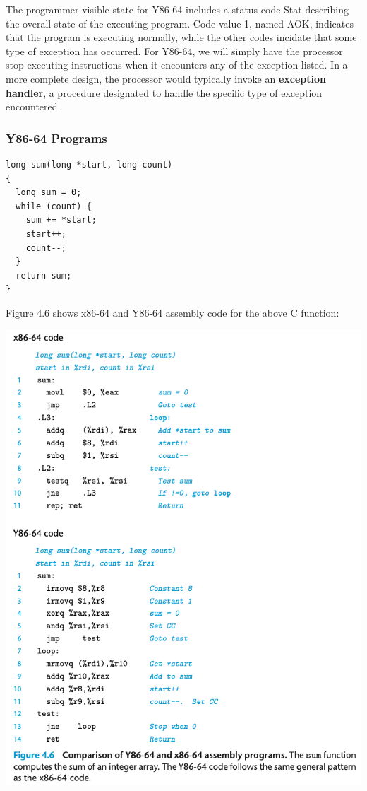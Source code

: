 \documentclass[11pt]{article}
\begin{document}
The programmer-visible state for Y86-64 includes a status code Stat describing the overall state of the executing program. Code value 1, named AOK, indicates that the program is executing normally, while the other codes incidate that some type of exception has occurred. For Y86-64, we will simply have the processor stop executing instructions when it encounters any of the exception listed. In a more complete design, the processor would typically invoke an \textbf{exception handler}, a procedure designated to handle the specific type of exception encountered.\\


\subsubsection{Y86-64 Programs}
\label{sec:org7ef6c3e}

\begin{verbatim}
long sum(long *start, long count)
{
  long sum = 0;
  while (count) {
    sum += *start;
    start++;
    count--;
  }
  return sum;
}
\end{verbatim}

Figure 4.6 shows x86-64 and Y86-64 assembly code for the above C function:\\

\begin{center}
\includegraphics[width=.9\linewidth]{pics/figure4.6-comparison-of-y86-64-assembly-programs.png}
\end{center}
\end{document}
